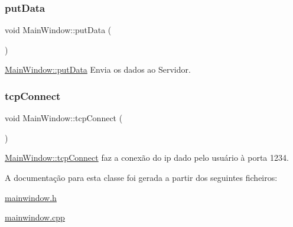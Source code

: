 \subsubsection{\texorpdfstring{put\+Data}{putData}}
{\footnotesize\ttfamily void Main\+Window\+::put\+Data (\begin{DoxyParamCaption}{ }\end{DoxyParamCaption})\hspace{0.3cm}{\ttfamily [slot]}}



\hyperlink{classMainWindow_afdfeb13ec363b0eb8ecacaf0aa13b605}{Main\+Window\+::put\+Data} Envia os dados ao Servidor. 

\mbox{\label{classMainWindow_ac5b669957c442b6eb68573dacfce33e1}} 
\subsubsection{\texorpdfstring{tcp\+Connect}{tcpConnect}}
{\footnotesize\ttfamily void Main\+Window\+::tcp\+Connect (\begin{DoxyParamCaption}{ }\end{DoxyParamCaption})\hspace{0.3cm}{\ttfamily [slot]}}



\hyperlink{classMainWindow_ac5b669957c442b6eb68573dacfce33e1}{Main\+Window\+::tcp\+Connect} faz a conexão do ip dado pelo usuário à porta \textquotesingle{}1234\textquotesingle{}. 



A documentação para esta classe foi gerada a partir dos seguintes ficheiros\+:\begin{DoxyCompactItemize}
\item 
\hyperlink{mainwindow_8h}{mainwindow.\+h}\item 
\hyperlink{mainwindow_8cpp}{mainwindow.\+cpp}\end{DoxyCompactItemize}
